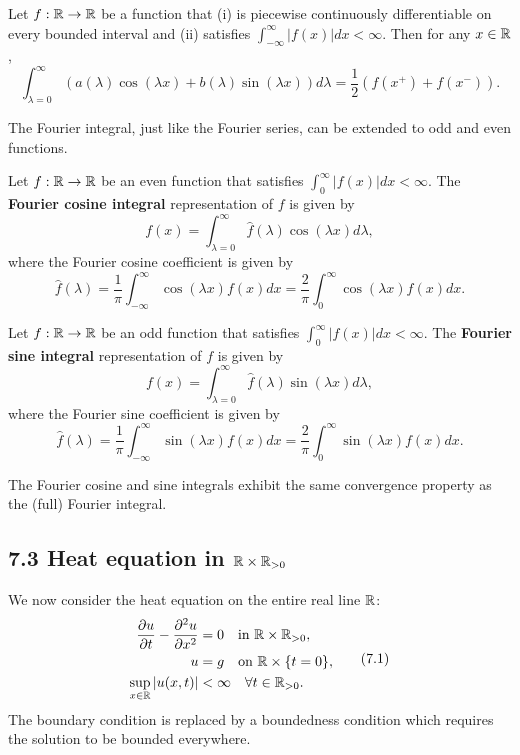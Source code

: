 \begin{theorem}
    Let $f : \mathbb{R} \to \mathbb{R}$ be a function that (i) is piecewise continuously differentiable on every bounded interval and (ii) satisfies $\int_{-\infty}^{\infty} |f(x)| dx < \infty$. Then for any $x \in \mathbb{R}$,
    \[\int_{\lambda=0}^{\infty} \left(a(\lambda) \cos(\lambda x) + b(\lambda) \sin(\lambda x)\right) d\lambda = \frac{1}{2}(f(x^+) + f(x^-)).\]
\end{theorem}

The Fourier integral, just like the Fourier series, can be extended to odd and even functions.

\begin{definition}
    Let $f : \mathbb{R} \to \mathbb{R}$ be an even function that satisfies $\int_0^{\infty} |f(x)| dx < \infty$. The \textbf{Fourier cosine integral} representation of $f$ is given by
    \[f(x) = \int_{\lambda=0}^{\infty} \hat{f}(\lambda) \cos(\lambda x) d\lambda,\]
    where the Fourier cosine coefficient is given by
    \[\hat{f}(\lambda) = \frac{1}{\pi} \int_{-\infty}^{\infty} \cos(\lambda x) f(x) dx = \frac{2}{\pi} \int_0^{\infty} \cos(\lambda x) f(x) dx.\]
\end{definition}

\begin{definition}
    Let $f : \mathbb{R} \to \mathbb{R}$ be an odd function that satisfies $\int_0^{\infty} |f(x)| dx < \infty$. The \textbf{Fourier sine integral} representation of $f$ is given by
    \[f(x) = \int_{\lambda=0}^{\infty} \hat{f}(\lambda) \sin(\lambda x) d\lambda,\]
    where the Fourier sine coefficient is given by
    \[\hat{f}(\lambda) = \frac{1}{\pi} \int_{-\infty}^{\infty} \sin(\lambda x) f(x) dx = \frac{2}{\pi} \int_0^{\infty} \sin(\lambda x) f(x) dx.\]
\end{definition}

The Fourier cosine and sine integrals exhibit the same convergence property as the (full) Fourier integral.

\subsection{7.3 Heat equation in $\mathbb{R} \times \mathbb{R}_{>0}$}
We now consider the heat equation on the entire real line $\mathbb{R}$:
\begin{equation*}
    \begin{aligned}
        \frac{\partial u}{\partial t} - \frac{\partial^2 u}{\partial x^2} &= 0 \quad \text{in } \mathbb{R} \times \mathbb{R}_{>0}, \\
        u &= g \quad \text{on } \mathbb{R} \times \{t = 0\}, \\
        \sup_{x \in \mathbb{R}} |u(x, t)| &< \infty \quad \forall t \in \mathbb{R}_{>0}.
    \end{aligned} \tag{7.1}
\end{equation*}
The boundary condition is replaced by a boundedness condition which requires the solution to be bounded everywhere.

